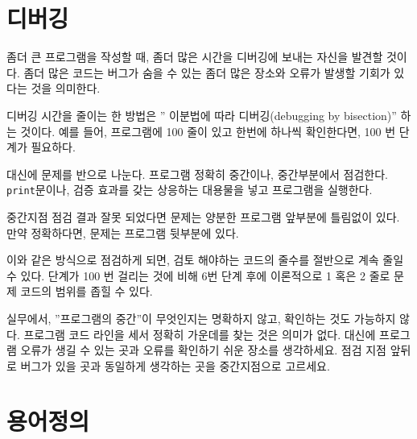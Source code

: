 \section{  디버깅}
 
좀더 큰 프로그램을 작성할 때, 좀더 많은 시간을 디버깅에 보내는 자신을 발견할 것이다.
좀더 많은 코드는 버그가 숨을 수 있는 좀더 많은 장소와 오류가 발생할 기회가 있다는 것을 의미한다.


디버깅 시간을 줄이는 한 방법은 '' 이분법에 따라 디버깅(debugging by bisection)'' 하는 것이다.
예를 들어, 프로그램에 100 줄이 있고 한번에 하나씩 확인한다면, 100 번 단계가 필요하다.

대신에 문제를 반으로 나눈다. 
프로그램 정확히 중간이나, 중간부분에서 점검한다.
{\tt print}문이나, 검증 효과를 갖는 상응하는 대용물을 넣고 프로그램을 실행한다. 

중간지점 점검 결과 잘못 되었다면 문제는 양분한 프로그램 앞부분에 틀림없이 있다. 만약 정확하다면, 문제는 프로그램 뒷부분에 있다.

이와 같은 방식으로 점검하게 되면, 검토 해야하는 코드의 줄수를 절반으로 계속 줄일 수 있다.
단계가 100 번 걸리는 것에 비해 6번 단계 후에 이론적으로 1 혹은 2 줄로 문제 코드의 범위를 좁힐 수 있다.

실무에서, ''프로그램의 중간''이 무엇인지는 명확하지 않고, 확인하는 것도 가능하지 않다. 
프로그램 코드 라인을 세서 정확히 가운데를 찾는 것은 의미가 없다.
대신에 프로그램 오류가 생길 수 있는 곳과 오류를 확인하기 쉬운 장소를 생각하세요. 
점검 지점 앞뒤로 버그가 있을 곳과 동일하게 생각하는 곳을 중간지점으로 고르세요.

\section{  용어정의}


